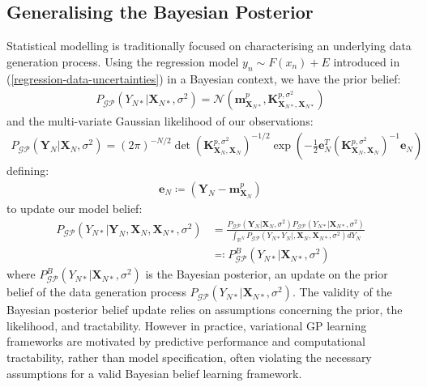 \documentclass{article}
\newcommand{\GP}{\operatorname{\mathcal{GP}}}
\numberwithin{equation}{section}
\begin{document}
\subsection{Generalising the Bayesian Posterior}
Statistical modelling is traditionally focused on characterising an underlying data generation process. Using the regression model $y_n \sim F(x_n) + E$ introduced in (\ref{regression-data-uncertainties}) in a Bayesian context, we have the prior belief:
\begin{align}
    P_{\GP}\left(Y_{N*}\vert \mathbf{X}_{N*}, \sigma^2\right) = \mathcal{N}\left(\mathbf{m}^p_{\mathbf{X}_{N*}}, \mathbf{K}^{p, \sigma^2}_{\mathbf{X}_{N*}, \mathbf{X}_{N*}}\right)
    \label{gp-prior-normal}
\end{align}
and the multi-variate Gaussian likelihood of our observations:
\begin{align}
    P_{\GP}\left(\mathbf{Y}_N|\mathbf{X}_N, \sigma^2\right) = \left(2 \pi\right)^{-N/2} \det\left(\mathbf{K}^{p, \sigma^2}_{\mathbf{X}_{N}, \mathbf{X}_{N}}\right)^{-1/2} \exp\left(-\frac{1}{2}\mathbf{e}_N^T\left(\mathbf{K}^{p, \sigma^2}_{\mathbf{X}_{N}, \mathbf{X}_{N}}\right)^{-1}\mathbf{e}_N\right)
    \label{gp-likelihood-normal}
\end{align}
defining:
\begin{align}
    \mathbf{e}_N \coloneqq \left(\mathbf{Y}_N - \mathbf{m}^p_{\mathbf{X}_{N}} \right)
\end{align}
to update our model belief: 
\begin{align}
\label{bayesian-posterior}
P_{\GP}\left(Y_{N*} \vert \mathbf{Y}_N, \mathbf{X}_N, \mathbf{X}_{N*}, \sigma^2 \right) &= \frac{P_{\GP}\left(\mathbf{Y}_N|\mathbf{X}_N, \sigma^2\right)P_{\GP}\left(Y_{N*}\vert \mathbf{X}_{N*}, \sigma^2\right)}{\int_{\mathbb{R}^{N}} P_{\GP}\left(Y_{N*} Y_N  \vert, \mathbf{X}_N, \mathbf{X}_{N*}, \sigma^2 \right) d Y_{N}} \\
\label{bayesian-posterior-definition}
&\eqqcolon P_{\GP}^B \left(Y_{N*} \vert\mathbf{X}_{N*}, \sigma^2 \right)
\end{align}
where $P_{\GP}^B \left(Y_{N*} \vert\mathbf{X}_{N*}, \sigma^2 \right)$ is the Bayesian posterior, an update on the prior belief of the data generation process $P_{\GP}\left(Y_{N*}\vert \mathbf{X}_{N*}, \sigma^2\right)$. The validity of the Bayesian posterior belief update relies on assumptions concerning the prior, the likelihood, and tractability. However in practice, variational GP learning frameworks are motivated by predictive performance and computational tractability, rather than model specification, often violating the necessary assumptions for a valid Bayesian belief learning framework.
\end{document}
